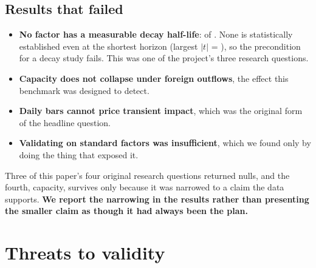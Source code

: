 \documentclass[11pt,a4paper]{article}
\begin{document}
\subsection{Results that failed}

\begin{itemize}
\item \textbf{No factor has a measurable decay half-life}: \fsNFactorsWithHalfLife{} of
  \fsNFactors{}. None is statistically established even at the shortest horizon
  (largest $|t|$ = \fsDecayMaxAbsTstatShortest{}), so the precondition for a decay study fails.
  This was one of the project's three research questions.
\item \textbf{Capacity does not collapse under foreign outflows}, the effect this benchmark was
  designed to detect.
\item \textbf{Daily bars cannot price transient impact}, which was the original form of the
  headline question.
\item \textbf{Validating on standard factors was insufficient}, which we found only by doing the
  thing that exposed it.
\end{itemize}

\begin{finding}
Three of this paper's four original research questions returned nulls, and the fourth, capacity,
survives only because it was narrowed to a claim the data supports. \textbf{We report the
narrowing in the results rather than presenting the smaller claim as though it had always been the
plan.}
\end{finding}

\section{Threats to validity}
\label{sec:threats}
\end{document}
